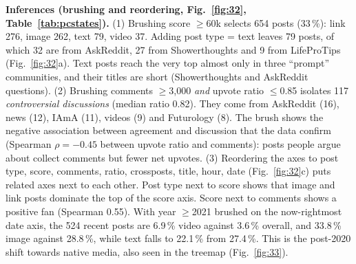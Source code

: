 \textbf{Inferences (brushing and reordering, Fig.~\ref{fig:32}, Table~\ref{tab:pcstates}).}
(1) Brushing score $\ge$60k selects 654 posts (33\,\%): link 276, image 262, text 79, video 37. Adding post type = text
leaves 79 posts, of which 32 are from AskReddit, 27 from Showerthoughts and 9 from LifeProTips (Fig.~\ref{fig:32}a). Text
posts reach the very top almost only in three ``prompt'' communities, and their titles are short (Showerthoughts and
AskReddit questions).
(2) Brushing comments $\ge$3,000 \emph{and} upvote ratio $\le$0.85 isolates 117 \emph{controversial discussions} (median
ratio 0.82). They come from AskReddit (16), news (12), IAmA (11), videos (9) and Futurology (8). The brush shows the
negative association between agreement and discussion that the data confirm (Spearman $\rho=-0.45$ between upvote ratio
and comments): posts people argue about collect comments but fewer net upvotes.
(3) Reordering the axes to post type, score, comments, ratio, crossposts, title, hour, date (Fig.~\ref{fig:32}c) puts
related axes next to each other. Post type next to score shows that image and link posts dominate the top of the score
axis. Score next to comments shows a positive fan (Spearman 0.55). With year $\ge$2021 brushed on the now-rightmost date
axis, the 524 recent posts are 6.9\,\% video against 3.6\,\% overall, and 33.8\,\% image against 28.8\,\%, while text falls to
22.1\,\% from 27.4\,\%. This is the post-2020 shift towards native media, also seen in the treemap (Fig.~\ref{fig:33}).


